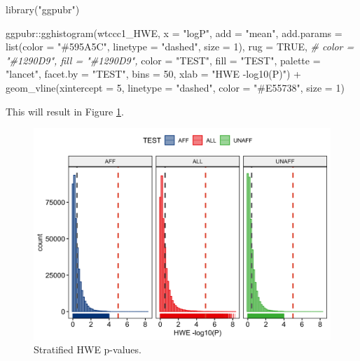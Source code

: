 \documentclass[
]{book}
\newenvironment{Shaded}{\begin{snugshade}}{\end{snugshade}}
\newcommand{\AttributeTok}[1]{\textcolor[rgb]{0.77,0.63,0.00}{#1}}
\newcommand{\CommentTok}[1]{\textcolor[rgb]{0.56,0.35,0.01}{\textit{#1}}}
\newcommand{\ConstantTok}[1]{\textcolor[rgb]{0.00,0.00,0.00}{#1}}
\newcommand{\DecValTok}[1]{\textcolor[rgb]{0.00,0.00,0.81}{#1}}
\newcommand{\FunctionTok}[1]{\textcolor[rgb]{0.00,0.00,0.00}{#1}}
\newcommand{\NormalTok}[1]{#1}
\newcommand{\SpecialCharTok}[1]{\textcolor[rgb]{0.00,0.00,0.00}{#1}}
\newcommand{\StringTok}[1]{\textcolor[rgb]{0.31,0.60,0.02}{#1}}
\begin{document}
\begin{Shaded}
\begin{Highlighting}[]
\FunctionTok{library}\NormalTok{(}\StringTok{"ggpubr"}\NormalTok{)}

\NormalTok{ggpubr}\SpecialCharTok{::}\FunctionTok{gghistogram}\NormalTok{(wtccc1\_HWE, }\AttributeTok{x =} \StringTok{"logP"}\NormalTok{,}
                    \AttributeTok{add =} \StringTok{"mean"}\NormalTok{,}
                    \AttributeTok{add.params =} \FunctionTok{list}\NormalTok{(}\AttributeTok{color =} \StringTok{"\#595A5C"}\NormalTok{, }\AttributeTok{linetype =} \StringTok{"dashed"}\NormalTok{, }\AttributeTok{size =} \DecValTok{1}\NormalTok{),}
                    \AttributeTok{rug =} \ConstantTok{TRUE}\NormalTok{,}
                    \CommentTok{\# color = "\#1290D9", fill = "\#1290D9",}
                    \AttributeTok{color =} \StringTok{"TEST"}\NormalTok{, }\AttributeTok{fill =} \StringTok{"TEST"}\NormalTok{,}
                    \AttributeTok{palette =} \StringTok{"lancet"}\NormalTok{,}
                    \AttributeTok{facet.by =} \StringTok{"TEST"}\NormalTok{,}
                    \AttributeTok{bins =} \DecValTok{50}\NormalTok{,}
                    \AttributeTok{xlab =} \StringTok{"HWE {-}log10(P)"}\NormalTok{) }\SpecialCharTok{+}
  \FunctionTok{geom\_vline}\NormalTok{(}\AttributeTok{xintercept =} \DecValTok{5}\NormalTok{, }\AttributeTok{linetype =} \StringTok{"dashed"}\NormalTok{,}
                \AttributeTok{color =} \StringTok{"\#E55738"}\NormalTok{, }\AttributeTok{size =} \DecValTok{1}\NormalTok{)}
\end{Highlighting}
\end{Shaded}

This will result in Figure \ref{fig:show-wtccc1-hwe}.

\begin{figure}

{\centering \includegraphics[width=18.67in]{img/_gwas/WTCCC1 HWE} 

}

\caption{Stratified HWE p-values.}\label{fig:show-wtccc1-hwe}
\end{figure}
\end{document}
